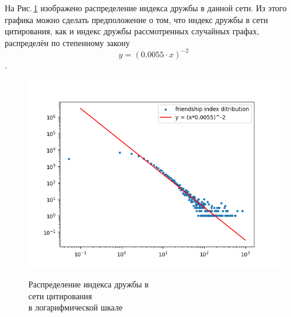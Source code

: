 \documentclass[bachelor, och, diploma]{SCWorks}
\begin{document}
На Рис.\,\ref{fig:cits} изображено распределение индекса дружбы в данной сети. Из этого графика можно сделать предположение о том, что индекс дружбы в сети цитирования, как и индекс дружбы рассмотренных случайных графах, распределён по степенному закону 
\[
y = (0.0055 \cdot x)^{-2}
\].
\begin{figure}[!ht]
\centering
\includegraphics[scale=0.7]{diploma_results/static_real_log/Cit-HepPh.png}\\
\caption{Распределение индекса дружбы  в\\ сети цитирования\\ в логарифмической шкале}\label{fig:cits}
\end{figure}
\end{document}
